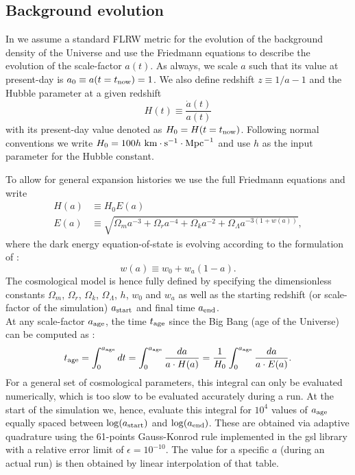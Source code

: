 \subsection{Background evolution}
\label{ssec:flrw}

In \swift we assume a standard FLRW metric for the evolution of the
background density of the Universe and use the Friedmann equations to
describe the evolution of the scale-factor $a(t)$.  As always, we
scale $a$ such that its value at present-day is
$a_0 \equiv a(t=t_{\rm now}) = 1$. We also define redshift
$z \equiv 1/a - 1$ and the Hubble parameter at a given redshift
\begin{equation}
H(t) \equiv \frac{\dot{a}(t)}{a(t)}
\end{equation}
with its present-day value denoted as $H_0 = H(t=t_{\rm
  now})$. Following normal conventions we write
$H_0 = 100 h~\rm{km}\cdot\rm{s}^{-1}\cdot\rm{Mpc}^{-1}$ and use $h$ as
the input parameter for the Hubble constant.

To allow for general expansion histories we use the full Friedmann
equations and write
\begin{align}
H(a) &\equiv H_0 E(a) \\
     E(a) &\equiv\sqrt{\Omega_m a^{-3} + \Omega_r a^{-4} + \Omega_k a^{-2} + \Omega_\Lambda a^{-3(1+w(a))}},
\label{eq:friedmann}
\end{align}
where the dark energy equation-of-state is evolving according to the
formulation of \cite{Linder2003}:
\begin{equation}
w(a) \equiv w_0 + w_a(1-a).
\end{equation}
The cosmological model is hence fully defined by specifying the
dimensionless constants $\Omega_m$, $\Omega_r$, $\Omega_k$,
$\Omega_\Lambda$, $h$, $w_0$ and $w_a$ as well as the starting
redshift (or scale-factor of the simulation) $a_{\rm start}$ and final
time $a_{\rm end}$. \\ At any scale-factor $a_{\rm age}$, the time
$t_{\rm age}$ since the Big Bang (age of the Universe) can be computed
as \citep[e.g.][]{Wright2006}:
\begin{equation}
  t_{\rm age} = \int_{0}^{a_{\rm age}} dt = \int_{0}^{a_{\rm age}} \frac{da}{a \cdot H(a)} = \frac{1}{H_0} \int_{0}^{a_{\rm age}} \frac{da}{a \cdot E(a)}.
\end{equation}
For a general set of cosmological parameters, this integral can only
be evaluated numerically, which is too slow to be evaluated accurately
during a run. At the start of the simulation we, hence, evaluate this
integral for $10^4$ values of $a_{\rm age}$ equally spaced between
$\log(a_{\rm start})$ and $\log(a_{\rm end})$. These are obtained via
adaptive quadrature using the 61-points Gauss-Konrod rule implemented
in the {\sc gsl} library \citep{GSL} with a relative error limit of
$\epsilon=10^{-10}$. The value for a specific $a$ (during an actual
run) is then obtained by linear interpolation of that table.

